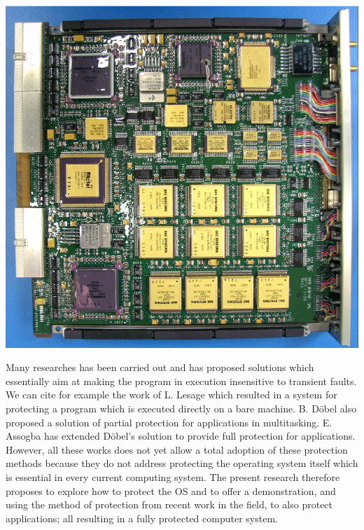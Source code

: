 \begin{minipage}[t]{0.48\textwidth} \begin{flushright}\vspace{-3ex}
		\includegraphics[width=1.1\textwidth]{image/RAD750}
		\vspace{0.05ex}
		\label{fig:rad750}
\end{flushright}\end{minipage}

Many researches has been carried out and has proposed solutions which essentially aim at making the program in execution insensitive to transient faults. We can cite for example the work of L. Lesage which resulted in a system for protecting a program which is executed directly on a bare machine. B. Döbel also proposed a solution of partial protection for applications in multitasking. E. Assogba has extended Döbel's solution to provide full protection for applications. However, all these works does not yet allow a total adoption of these protection methods because they do not address protecting the operating system itself which is essential in every current computing system. The present research therefore proposes to explore how to protect the OS and to offer a demonstration, and using the method of protection from recent work in the field, to also protect applications; all resulting in a fully protected computer system.

